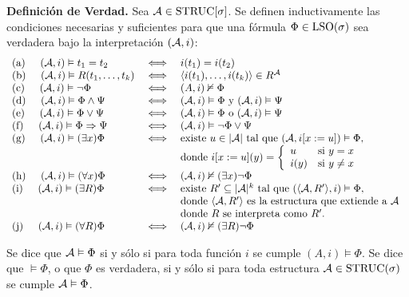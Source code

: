 \begin{definition}
\label{semantica_def}
\textbf{Definición de Verdad.} Sea $\mathcal{A} \in \text{STRUC}[\sigma]$.
Se definen inductivamente las condiciones necesarias y suficientes para que 
una fórmula $\Phi \in \text{LSO}(\sigma)$ sea verdadera bajo la interpretación $(\mathcal{A}, i)$:
\[
\begin{array}{lcl}
\text{(a)} \hspace{5mm} (\mathcal{A}, i) \vDash t_1 = t_2 & \iff & i(t_1) = i(t_2)\\
\text{(b)} \hspace{5mm} (\mathcal{A}, i) \vDash R(t_1,\ldots,t_{k}) & \iff & \langle i(t_1),\ldots,i(t_{k}) \rangle \in R^{\mathcal{A}}\\
\text{(c)} \hspace{5mm} (\mathcal{A}, i) \vDash \neg \Phi & \iff & (A, i) \nvDash \Phi\\
\text{(d)} \hspace{5mm} (\mathcal{A}, i) \vDash \Phi \land \Psi & \iff & (\mathcal{A}, i) \vDash \Phi \mbox{ y } (\mathcal{A}, i) \vDash \Psi\\
\text{(e)} \hspace{5mm} (\mathcal{A}, i) \vDash \Phi \lor \Psi & \iff & (\mathcal{A}, i) \vDash \Phi \mbox{ o } (\mathcal{A}, i) \vDash \Psi\\
\text{(f)} \hspace{5mm} (\mathcal{A}, i) \vDash \Phi \Rightarrow \Psi & \iff & (\mathcal{A}, i) \vDash \neg \Phi \lor \Psi\\
\text{(g)} \hspace{5mm} (\mathcal{A}, i) \vDash (\exists x) \Phi & \iff & \mbox{existe } u \in |\mathcal{A}| 
\mbox{ tal que } (\mathcal{A}, i [x:= u]) \vDash \Phi,\\
&&\mbox{donde } i[x:=u](y) = \left\{
     \begin{array}{lr}
       u & \mbox{si } y = x\\
       i(y) & \mbox{si } y \not= x
     \end{array}
   \right.\\
\text{(h)} \hspace{5mm} (\mathcal{A}, i) \vDash (\forall x) \Phi & \iff &
    (\mathcal{A}, i) \nvDash (\exists x) \neg \Phi\\
\text{(i)} \hspace{5mm} (\mathcal{A}, i) \vDash (\exists R) \Phi & \iff & \mbox{existe } R' \subseteq |\mathcal{A}|^k
\mbox{ tal que } (\langle \mathcal{A}, R' \rangle, i) \vDash \Phi,\\
&&\text{donde } \langle \mathcal{A}, R' \rangle \text{ es la estructura que extiende a $\mathcal{A}$ }\\
&&\text{donde $R$ se interpreta como $R'$.}\\
\text{(j)} \hspace{5mm} (\mathcal{A}, i) \vDash (\forall R) \Phi & \iff &
    (\mathcal{A}, i) \nvDash (\exists R) \neg \Phi\\
\end{array}
\]
\end{definition}
\begin{definition}
\label{semantica_def2}
Se dice que $\mathcal{A} \vDash \Phi$ si y sólo si para toda función $i$ se cumple $(A, i)
\models \Phi$. Se dice que $\models \Phi$, o que $\Phi$ es verdadera, si y sólo si para
toda estructura $\mathcal{A} \in \text{STRUC}(\sigma)$ se cumple $\mathcal{A} \vDash \Phi$.
\end{definition}

